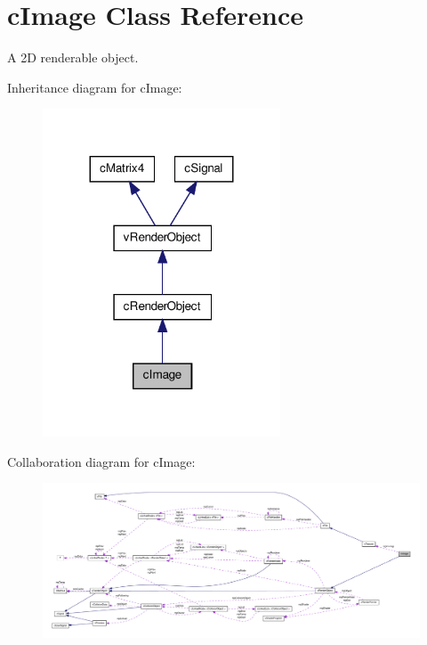 \hypertarget{classc_image}{
\section{cImage Class Reference}
\label{classc_image}
}


A 2D renderable object.  




Inheritance diagram for cImage:
\nopagebreak
\begin{figure}[H]
\begin{center}
\leavevmode
\includegraphics[width=200pt]{classc_image__inherit__graph}
\end{center}
\end{figure}


Collaboration diagram for cImage:
\nopagebreak
\begin{figure}[H]
\begin{center}
\leavevmode
\includegraphics[width=400pt]{classc_image__coll__graph}
\end{center}
\end{figure}
